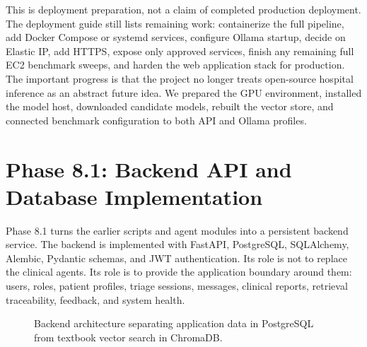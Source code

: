 This is deployment preparation, not a claim of completed production deployment. The deployment guide still lists remaining work: containerize the full pipeline, add Docker Compose or systemd services, configure Ollama startup, decide on Elastic IP, add HTTPS, expose only approved services, finish any remaining full EC2 benchmark sweeps, and harden the web application stack for production. The important progress is that the project no longer treats open-source hospital inference as an abstract future idea. We prepared the GPU environment, installed the model host, downloaded candidate models, rebuilt the vector store, and connected benchmark configuration to both API and Ollama profiles.

\section{Phase 8.1: Backend API and Database Implementation}

Phase 8.1 turns the earlier scripts and agent modules into a persistent backend service. The backend is implemented with FastAPI, PostgreSQL, SQLAlchemy, Alembic, Pydantic schemas, and JWT authentication. Its role is not to replace the clinical agents. Its role is to provide the application boundary around them: users, roles, patient profiles, triage sessions, messages, clinical reports, retrieval traceability, feedback, and system health.

\begin{figure}[htbp]
\centering
{}
\caption{Backend architecture separating application data in PostgreSQL from textbook vector search in ChromaDB.}
\label{fig:backend_application_architecture}
\end{figure}

